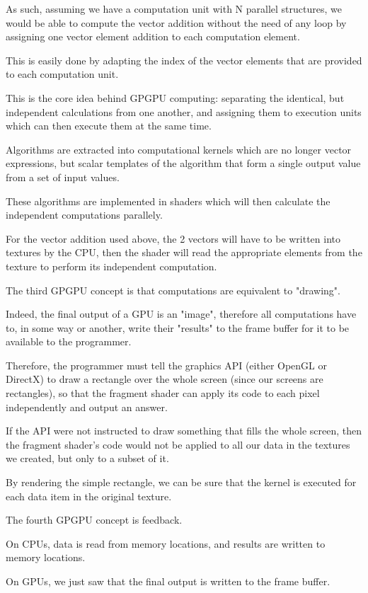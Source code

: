 \documentclass[10pt, a4paper]{report}
\begin{document}
As such, assuming we have a computation unit with N parallel structures, we
would be able to compute the vector addition without the need of any loop by
assigning one vector element addition to each computation element.

This is easily done by adapting the index of the vector elements that are
provided to each computation unit.

This is the core idea behind GPGPU computing: separating the identical, but
independent calculations from one another, and assigning them to execution units
which can then execute them at the same time.

Algorithms are extracted into computational kernels which are no longer vector
expressions, but scalar templates of the algorithm that form a single output
value from a set of input values.

These algorithms are implemented in shaders which will then calculate the
independent computations parallely.

For the vector addition used above, the 2 vectors will have to be written into
textures by the CPU, then the shader will read the appropriate elements from the
texture to perform its independent computation.

The third GPGPU concept is that computations are equivalent to "drawing".

Indeed, the final output of a GPU is an "image", therefore all computations have
to, in some way or another, write their "results" to the frame buffer for it to
be available to the programmer.

Therefore, the programmer must tell the graphics API (either OpenGL or DirectX)
to draw a rectangle over the whole screen (since our screens are rectangles), so
that the fragment shader can apply its code to each pixel independently and
output an answer.

If the API were not instructed to draw something that fills the whole screen,
then the fragment shader's code would not be applied to all our data in the
textures we created, but only to a subset of it.

By rendering the simple rectangle, we can be sure that the kernel is executed
for each data item in the original texture.

The fourth GPGPU concept is feedback.

On CPUs, data is read from memory locations, and results are written to memory
locations.

On GPUs, we just saw that the final output is written to the frame buffer.
\end{document}

